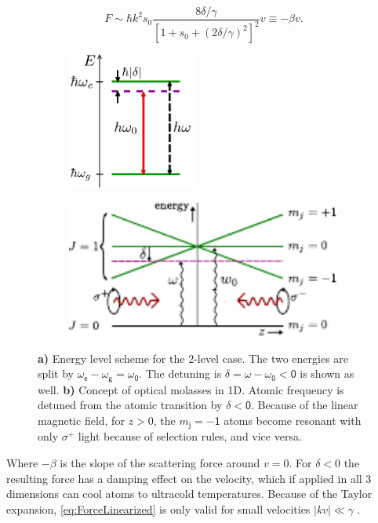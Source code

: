 \begin{equation}\label{eq:ForceLinearized}
	F \sim \hbar k^2 s_0 \frac{8\delta/\gamma}{\left[1+s_0+(2\delta/\gamma)^2\right]^2} v 
	\equiv -\beta v.
\end{equation}
\begin{figure}
\centering
	\begin{subfigure}{.38\textwidth}
		\centering
		\includegraphics[height=4.5cm]{figures/2LevelAtom.pdf}
		\caption{}
		\label{fig:2LevelAtom}
	\end{subfigure}
	\begin{subfigure}{.61\textwidth}
		\centering
		\includegraphics[height=4.5cm]{figures/Molasses.pdf}
		\caption{}
		\label{fig:MOTPlots}
	\end{subfigure}
	\caption{\textbf{a)} Energy level scheme for the 2-level case. 
	The two energies are split by $\mathsf{\omega_e - \omega_g = \omega_0}$.
	The detuning is $\mathsf{\delta = \omega-\omega_0<0}$ is shown as well.
	\textbf{b)} Concept of optical molasses in 1D. 
	Atomic frequency is detuned from the atomic transition by $\mathsf{\delta<0}$.
	Because of the linear magnetic field, for $z>0$, the $\mathsf{\textit{m}_j=-1}$ atoms become resonant with only $\mathsf{\sigma^+}$ light because of selection rules, and vice versa.}
\end{figure}
Where $-\beta$ is the slope of the scattering force around $v=0$. 
For $\delta<0$ the resulting force has a damping effect on the velocity, which if applied in all 3 dimensions can cool atoms to ultracold temperatures. 
Because of the Taylor expansion, \cref{eq:ForceLinearized} is only valid for small velocities $|kv| \ll \gamma$ \cite{Kowalski2010}.

